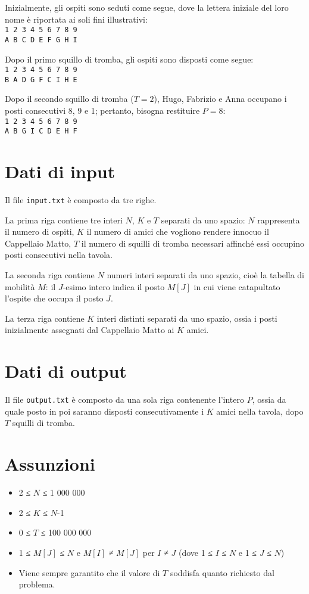 \documentclass[a4paper,11pt]{article}
\begin{document}
Inizialmente, gli ospiti sono seduti come segue, dove la
lettera iniziale del loro nome è riportata ai soli fini
illustrativi:\\ 
\texttt{1 2 3 4 5 6 7 8 9}\\
\texttt{A B C D E F G H I}

Dopo il primo squillo di tromba, gli ospiti sono disposti come segue:\\
\texttt{1 2 3 4 5 6 7 8 9}\\
\texttt{B A D G F C I H E}

Dopo il secondo squillo di tromba ($T=2$), Hugo, Fabrizio e
Anna occupano i posti consecutivi 8, 9 e 1; pertanto, bisogna
restituire  $P=8$:\\
\texttt{1 2 3 4 5 6 7 8 9}\\
\texttt{A B G I C D E H F}


\section*{Dati di input}
  
Il file \texttt{input.txt} è composto da tre righe.

La prima riga contiene tre interi $N$, $K$ e $T$
separati da uno spazio: $N$ rappresenta il numero di ospiti,
$K$ il numero di amici che vogliono rendere innocuo il
Cappellaio Matto, $T$ il numero di squilli di tromba
necessari affinché essi occupino posti consecutivi nella tavola.

La seconda riga contiene $N$ numeri interi separati da uno
spazio, cioè la tabella di mobilità $M$:
il $J$-esimo intero indica il posto $M[J]$
in cui viene catapultato l'ospite che occupa il posto $J$.

La terza riga contiene $K$ interi distinti separati da uno
spazio, ossia i posti inizialmente assegnati dal Cappellaio Matto
ai $K$ amici.


\section*{Dati di output}
  
Il file \texttt{output.txt} è composto da una sola riga
contenente l'intero $P$, ossia da quale posto in poi saranno
disposti consecutivamente i $K$ amici nella tavola,
dopo $T$ squilli di tromba.

  \section*{Assunzioni}
  \begin{itemize}
  
    \item  2 ≤ $N$ ≤ 1 000 000
    \item  2 ≤ $K$ ≤ $N$-1
    \item  0 ≤ $T$ ≤ 100 000 000
    \item  1 ≤ $M[J]$ ≤ $N$ e $M[I]$
  ≠ $M[J]$ per  $I$ ≠ $J$ (dove 1
  ≤ $I$ ≤ $N$ e 1 ≤ $J$ ≤ $N$) 
    \item  Viene sempre  garantito che il valore di $T$ soddisfa
  quanto richiesto dal problema.
  \end{itemize}
\end{document}
